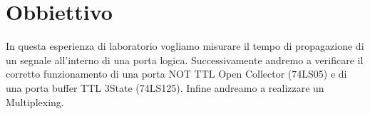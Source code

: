 \section*{Obbiettivo}

In questa esperienza di laboratorio vogliamo misurare il tempo di propagazione di un segnale all'interno di una porta logica. Successivamente andremo a verificare il corretto funzionamento di una porta NOT TTL Open Collector (74LS05) e di una porta buffer TTL 3State (74LS125). Infine andreamo a realizzare un Multiplexing.
